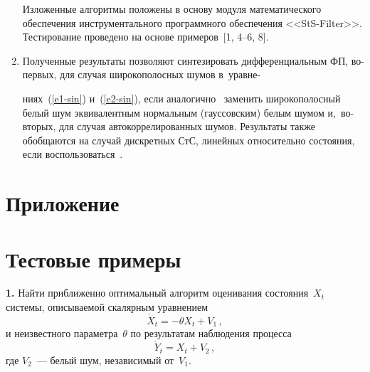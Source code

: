 \begin{multicols}{2}
\begin{enumerate}[1.]
Изложенные алгоритмы положены в основу модуля математического обеспечения инструментального программного обеспечения <<StS-Filter>>. Тестирование проведено на основе примеров~[1, 4--6, 8].

\item Полученные результаты  позволяют синтезировать дифференциальным ФП,
 во-пер\-вых, для случая широкополосных шумов в~уравне-\linebreak\vspace*{-12pt}

 \pagebreak

 \noindent
 ниях~(\ref{e1-sin}) и~(\ref{e2-sin}), если аналогично~\cite{3-sin} заменить широкополосный белый шум эквивалентным нормальным (гауссовским) белым шумом и,~во-вто\-рых, для случая автокоррелированных шумов. Результаты также обобщаются на случай дискретных СтС, линейных относительно состояния, если воспользоваться~\cite{4-sin}.
    \end{enumerate}

    \setcounter{equation}{0}
{\small \section*{\raggedleft Приложение}

\renewcommand{\theequation}{П.\arabic{equation}}


\section*{Тестовые примеры}


\textbf{1.} Найти приближенно оптимальный алгоритм оценивания
 состояния~$X_t$ системы, описываемой скалярным уравнением
    \begin{equation}
    \dot X_t =- \theta X_t + V_1\,,\label{p1}
    \end{equation}
 и неизвестного параметра~$\theta$ по результатам наблюдения
 процесса
    \begin{equation}
    \dot Y_t= X_t+ V_2\,,\label{p2}
    \end{equation}
где  $V_2$~--- белый шум, независимый от~$V_1$.

}
\end{multicols}
